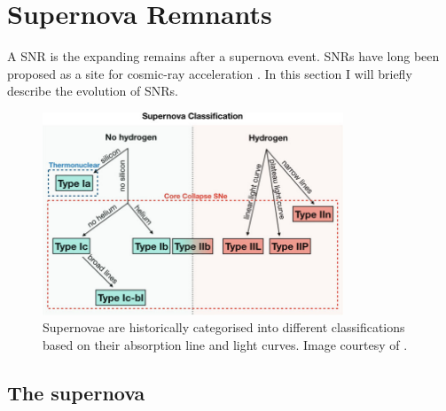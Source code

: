 \chapter{Supernova Remnants} \label{appendix:snrs}

A SNR is the expanding remains %
after a supernova event. SNRs have long been proposed as a site for cosmic-ray acceleration \citep{1934CoMtW...3...73B}. In this section I will briefly describe the evolution of SNRs.

\begin{figure}
    \centering
    \includegraphics[width=0.8\textwidth]{A1_Supernova_Remnants/Images/supernova_classification.pdf}
    \caption{Supernovae are historically categorised into different classifications based on their absorption line and light curves. Image courtesy of \cite{alma9928040781501811}.}
    \label{fig:A1_supernova_classification}
\end{figure}


\section{The supernova}

